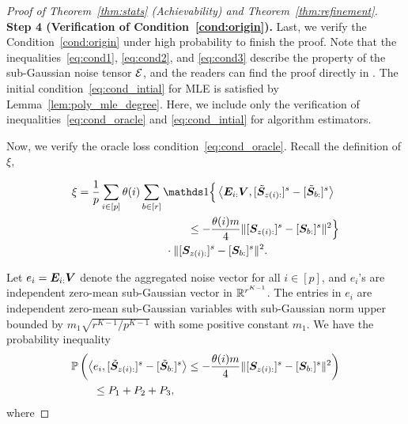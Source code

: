 \documentclass[journal]{IEEEtran}
\theoremstyle{definition}
\theoremstyle{definition}
\newcommand{\of}[1]{\left(#1\right)}
\newcommand{\offf}[1]{\left\{#1\right\}}
\newcommand{\ang}[1]{\left\langle#1\right\rangle}
\begin{document}
\begin{proof}[Proof of Theorem~\ref{thm:stats} (Achievability) and Theorem~\ref{thm:refinement}]
   
    
    {\bf Step 4 (Verification of Condition~\ref{cond:origin}).} Last, we verify the Condition~\ref{cond:origin} under high probability to finish the proof. Note that the inequalities~\eqref{eq:cond1}, \eqref{eq:cond2}, and \eqref{eq:cond3} describe the property of the sub-Gaussian noise tensor $\mathcal{E}$, and the readers can find the proof directly in \cite[Step 5, Proof of Theorem 2]{han2020exact}. The initial condition~\eqref{eq:cond_intial} for MLE is satisfied by Lemma~\ref{lem:poly_mle_degree}. Here, we include only the verification of inequalities~\eqref{eq:cond_oracle} and \eqref{eq:cond_intial} for algorithm estimators. 
    
    Now, we verify the oracle loss condition~\eqref{eq:cond_oracle}. Recall the definition of $\xi$,

    \vspace{-0.5cm}
    \small
    \begin{align}
        \xi & = \frac{1}{p} \sum_{i \in [p]} \theta(i) \sum_{b \in [r]} \ind \Big\{\ang{ \mE_{i:} \mV, [  \tilde \mS_{z(i):} ]^s - [  \tilde \mS_{b:} ]^s} \\
         & \quad \quad \quad \quad \quad \quad \quad \quad \quad \quad \leq - \frac{ \theta(i) m}{4} \onormSize{}{ [ \mS_{z(i):}  ]^s - [ \mS_{b:}  ]^s  }^2 \Big\} \\
         & \quad \quad \quad \quad \quad \quad \quad \quad \cdot \onormSize{}{ [ \mS_{z(i):}  ]^s - [ \mS_{ b:}  ]^s  }^2.
    \end{align}
    \normalsize

    Let $e_i = \bm{E}_{i:} \bm{V}$ denote the aggregated noise vector for all $i \in [p]$, and $e_i$'s are independent zero-mean sub-Gaussian vector in $\mathbb{R}^{r^{K-1}}$. The entries in $e_i$ are independent zero-mean sub-Gaussian variables with sub-Gaussian norm upper bounded by $m_1\sqrt{r^{K-1}/p^{K-1}}$ with some positive constant $m_1$. We have the probability inequality
    \begin{align}
        &\bbP \of{ \ang{ e_i, [  \tilde \mS_{z(i):} ]^s - [  \tilde \mS_{b:} ]^s } \leq - \frac{ \theta(i) m}{4} \onormSize{}{ [ \mS_{z(i):}  ]^s - [ \mS_{b:}  ]^s  }^2}\\
        &\quad \quad \leq P_1 + P_2 + P_3,
    \end{align}
    where 


\end{proof}
\end{document}
